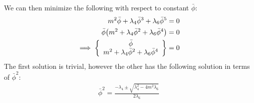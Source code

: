 \documentclass[12pt]{article}
\begin{document}
We can then minimize the following with respect to constant $\bar\phi$:
\begin{align*}
  m^2\bar\phi+\lambda_4\bar\phi^3+\lambda_6\bar\phi^5&=0\\
  \bar\phi\qty(m^2+\lambda_4\bar\phi^2+\lambda_6\bar\phi^4)&=0\\
  \implies\left\{
  \begin{array}[H]{c}
    \bar\phi\\
    m^2+\lambda_4\bar\phi^2+\lambda_6\bar\phi^4  
  \end{array}\right\}
  &=0
\end{align*}
The first solution is trivial, however the other has the following solution in terms of $\bar\phi^2$:
\begin{align}
  \boxed{
    \bar\phi^2=\frac{-\lambda_4\pm\sqrt{\lambda_4^2-4m^2\lambda_6}}{2\lambda_6}
  }
\end{align}
\end{document}
